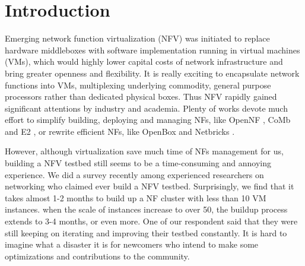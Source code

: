 \section{Introduction}
Emerging network function virtualization (NFV) was initiated to replace hardware middleboxes with software implementation running in virtual machines (VMs), which would highly lower capital costs of network infrastructure and bring greater openness and flexibility.
It is really exciting to encapsulate network functions into VMs, multiplexing underlying commodity, general purpose processors rather than dedicated physical boxes.
Thus NFV rapidly gained significant attentions by industry and academia. Plenty of works devote much effort to simplify building, deploying and managing NFs, like OpenNF \cite{gember-jacobson_opennf:_2014}, CoMb \cite{180672} and E2 \cite{palkar_e2:_2015}, or rewrite efficient NFs, like OpenBox \cite{bremler-barr_openbox:_2016} and Netbricks \cite{199352}.



However, although virtualization save much time of NFs management for us, building a NFV testbed still seems to be a time-consuming and annoying experience. We did a survey recently among experienced researchers on networking who claimed ever build a NFV testbed. Surprisingly, we find that it takes almost 1-2 months to build up a NF cluster with less than 10 VM instances. when the scale of instances increase to over 50, the buildup process extends to 3-4 months, or even more. One of our respondent said that they were still keeping on iterating and improving their testbed constantly. It is hard to imagine what a disaster it is for newcomers who intend to make some optimizations and contributions to the community. 


